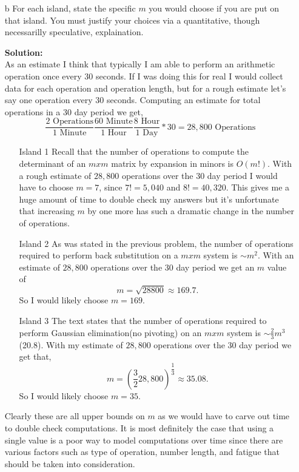 \documentclass[12pt]{article}
\makeatletter
\theoremstyle{homework}
\newenvironment{exercise}[1]
{\def\@currentlabel{#1}\exercisecore}
{\endexercisecore}
\newcommand{\localhead}[1]{\par\smallskip\noindent\textbf{#1}\nobreak\\}%
\newcommand\solution{\localhead{Solution:}}
\makeatother
\begin{document}
\begin{exercise}{F2}
\begin{enumerate}
    \item[b] For each island, state the specific $m$ you would choose if you are put on that island. You must justify your choices via a quantitative, though necessarilly speculative, explaination.\\
    \solution As an estimate I think that typically I am able to perform an arithmetic operation once every 30 seconds. If I was doing this for real I would collect data for each operation and operation length, but for a rough estimate let's say
    one operation every 30 seconds. Computing an estimate for total operations in a 30 day period we get, 
    \begin{equation*}
      \dfrac{2 \text{ Operations}}{1 \text{ Minute}} \dfrac{60 \text{ Minute}}{1 \text{ Hour}} \dfrac{8 \text{ Hour}}{1 \text{ Day}}*30 = 28,800 \text{ Operations}
    \end{equation*}
    \begin{enumerate}
      \item[Island 1] Recall that the number of operations to compute the determinant of an $mxm$ matrix by expansion in minors is $O(m!)$. With a rough estimate of $28,800$ operations over the 30 day period I would have to choose $m = 7$, since 
      $7! = 5,040$ and $8! = 40,320$. This gives me a huge amount of time to double check my answers but it's unfortunate that increasing $m$ by one more has such a dramatic change in the number of operations.\\
      \item[Island 2] As was stated in the previous problem, the number of operations required to perform back substitution on a $mxm$ system is $\sim m^2$. With an estimate of $28,800$ operations over the 30 day period we get an $m$ value of 
      \begin{equation*}
        m = \sqrt{28800} \approx 169.7.
      \end{equation*} 
      So I would likely choose $m = 169$.\\
      \item[Island 3] The text states that the number of operations required to perform Gaussian elimination(no pivoting) on an $mxm$ system is $\sim \frac{2}{3}m^3$(20.8). With my estimate of $28,800$ operations over the 30 day period we get that, 
      \begin{equation*}
        m = (\dfrac{3}{2}28,800)^{\dfrac{1}{3}} \approx 35.08. 
      \end{equation*}
      So I would likely choose $m = 35$.\\
    \end{enumerate} 
    Clearly these are all upper bounds on $m$ as we would have to carve out time to double check computations. It is most definitely the case that using a single value is a poor way to model computations over time since there are various factors such as type of operation, number length, 
    and fatigue that should be taken into consideration. 
    \vspace{.25in}



\end{enumerate}
\end{exercise}
\end{document}
